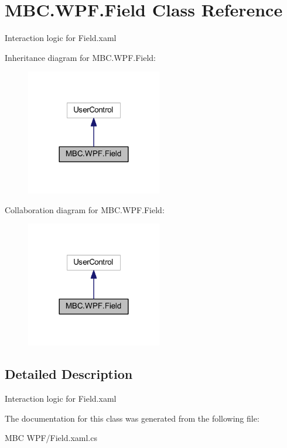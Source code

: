 \hypertarget{class_m_b_c_1_1_w_p_f_1_1_field}{\section{M\-B\-C.\-W\-P\-F.\-Field Class Reference}
\label{class_m_b_c_1_1_w_p_f_1_1_field}
}


Interaction logic for Field.\-xaml  




Inheritance diagram for M\-B\-C.\-W\-P\-F.\-Field\-:
\nopagebreak
\begin{figure}[H]
\begin{center}
\leavevmode
\includegraphics[width=168pt]{class_m_b_c_1_1_w_p_f_1_1_field__inherit__graph}
\end{center}
\end{figure}


Collaboration diagram for M\-B\-C.\-W\-P\-F.\-Field\-:
\nopagebreak
\begin{figure}[H]
\begin{center}
\leavevmode
\includegraphics[width=168pt]{class_m_b_c_1_1_w_p_f_1_1_field__coll__graph}
\end{center}
\end{figure}


\subsection{Detailed Description}
Interaction logic for Field.\-xaml 



The documentation for this class was generated from the following file\-:\begin{DoxyCompactItemize}
\item 
M\-B\-C W\-P\-F/Field.\-xaml.\-cs\end{DoxyCompactItemize}
